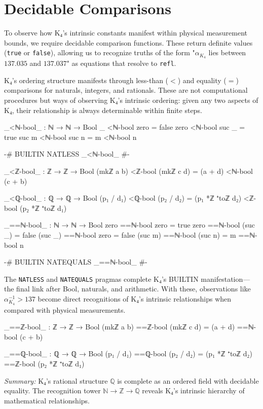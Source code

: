 \documentclass[11pt,a4paper]{book}
\begin{document}
\section{Decidable Comparisons}

To observe how K₄'s intrinsic constants manifest within physical measurement bounds, we require decidable comparison functions. These return definite values (\texttt{true} or \texttt{false}), allowing us to recognize truths of the form "$\alpha_{K_4}$ lies between $137.035$ and $137.037$" as equations that resolve to \texttt{refl}.

K₄'s ordering structure manifests through less-than ($<$) and equality ($=$) comparisons for naturals, integers, and rationals. These are not computational procedures but ways of observing K₄'s intrinsic ordering: given any two aspects of K₄, their relationship is always determinable within finite steps.

\begin{code}
_<ℕ-bool_ : ℕ → ℕ → Bool
_ <ℕ-bool zero = false
zero <ℕ-bool suc _ = true
suc m <ℕ-bool suc n = m <ℕ-bool n

{-# BUILTIN NATLESS _<ℕ-bool_ #-}

_<ℤ-bool_ : ℤ → ℤ → Bool
(mkℤ a b) <ℤ-bool (mkℤ c d) = (a + d) <ℕ-bool (c + b)

_<ℚ-bool_ : ℚ → ℚ → Bool
(p₁ / d₁) <ℚ-bool (p₂ / d₂) = 
  (p₁ *ℤ ⁺toℤ d₂) <ℤ-bool (p₂ *ℤ ⁺toℤ d₁)

_==ℕ-bool_ : ℕ → ℕ → Bool
zero ==ℕ-bool zero = true
zero ==ℕ-bool (suc _) = false
(suc _) ==ℕ-bool zero = false
(suc m) ==ℕ-bool (suc n) = m ==ℕ-bool n

{-# BUILTIN NATEQUALS _==ℕ-bool_ #-}
\end{code}

The \texttt{NATLESS} and \texttt{NATEQUALS} pragmas complete K₄'s BUILTIN manifestation—the final link after Bool, naturals, and arithmetic. With these, observations like $\alpha_{K_4}^{-1} > 137$ become direct recognitions of K₄'s intrinsic relationships when compared with physical measurements.

\begin{code}
_==ℤ-bool_ : ℤ → ℤ → Bool
(mkℤ a b) ==ℤ-bool (mkℤ c d) = (a + d) ==ℕ-bool (c + b)

_==ℚ-bool_ : ℚ → ℚ → Bool
(p₁ / d₁) ==ℚ-bool (p₂ / d₂) = 
  (p₁ *ℤ ⁺toℤ d₂) ==ℤ-bool (p₂ *ℤ ⁺toℤ d₁)
\end{code}

\medskip
\noindent\textit{Summary:} K₄'s rational structure $\mathbb{Q}$ is complete as an ordered field with decidable equality. The recognition tower $\mathbb{N} \to \mathbb{Z} \to \mathbb{Q}$ reveals K₄'s intrinsic hierarchy of mathematical relationships.
\end{document}
